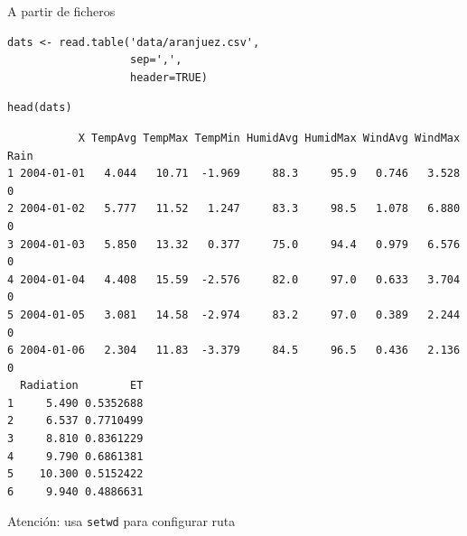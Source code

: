 \documentclass[xcolor={usenames,svgnames,dvipsnames}]{beamer}
\begin{document}
\begin{frame}[fragile,label={sec:orga5edc36}]{A partir de ficheros}
 \lstset{language=r,label= ,caption= ,captionpos=b,numbers=none}
\begin{lstlisting}
dats <- read.table('data/aranjuez.csv',
                   sep=',',
                   header=TRUE)
\end{lstlisting}

\lstset{language=r,label= ,caption= ,captionpos=b,numbers=none}
\begin{lstlisting}
head(dats)
\end{lstlisting}

\begin{verbatim}
           X TempAvg TempMax TempMin HumidAvg HumidMax WindAvg WindMax Rain
1 2004-01-01   4.044   10.71  -1.969     88.3     95.9   0.746   3.528    0
2 2004-01-02   5.777   11.52   1.247     83.3     98.5   1.078   6.880    0
3 2004-01-03   5.850   13.32   0.377     75.0     94.4   0.979   6.576    0
4 2004-01-04   4.408   15.59  -2.576     82.0     97.0   0.633   3.704    0
5 2004-01-05   3.081   14.58  -2.974     83.2     97.0   0.389   2.244    0
6 2004-01-06   2.304   11.83  -3.379     84.5     96.5   0.436   2.136    0
  Radiation        ET
1     5.490 0.5352688
2     6.537 0.7710499
3     8.810 0.8361229
4     9.790 0.6861381
5    10.300 0.5152422
6     9.940 0.4886631
\end{verbatim}

\alert{Atención: usa \texttt{setwd} para configurar ruta}
\end{frame}
\end{document}
